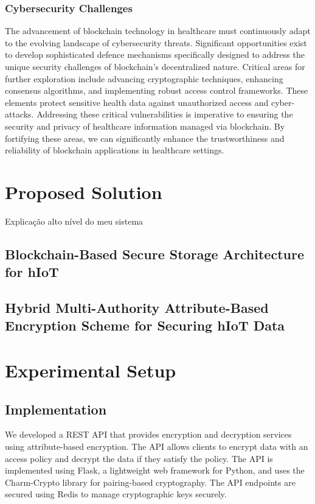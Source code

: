 \documentclass[cic,tc,english]{iiufrgs}
\begin{document}
        \subsection{Cybersecurity Challenges} 
            The advancement of blockchain technology in healthcare must continuously adapt to the evolving landscape of cybersecurity threats. Significant opportunities exist to develop sophisticated defence mechanisms specifically designed to address the unique security challenges of blockchain's decentralized nature. Critical areas for further exploration include advancing cryptographic techniques, enhancing consensus algorithms, and implementing robust access control frameworks. These elements protect sensitive health data against unauthorized access and cyber-attacks. Addressing these critical vulnerabilities is imperative to ensuring the security and privacy of healthcare information managed via blockchain. By fortifying these areas, we can significantly enhance the trustworthiness and reliability of blockchain applications in healthcare settings.

\chapter{Proposed Solution}
    \label{chap:proposedsolution}
    Explicação alto nível do meu sistema

    \section{Blockchain-Based Secure Storage Architecture for hIoT}
        \label{sec:architecture}

    \section{Hybrid Multi-Authority Attribute-Based Encryption Scheme for Securing hIoT Data}
        \label{sec:encryption}

\chapter{Experimental Setup}
    \label{chap:experimentalsetup}

    \section{Implementation}
        \label{sec:implementation}
        We developed a REST API that provides encryption and decryption services using attribute-based encryption. The API allows clients to encrypt data with an access policy and decrypt the data if they satisfy the policy. The API is implemented using Flask, a lightweight web framework for Python, and uses the Charm-Crypto library for pairing-based cryptography. The API endpoints are secured using Redis to manage cryptographic keys securely.
\end{document}
